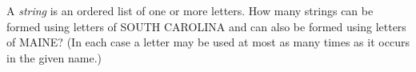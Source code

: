 A \emph{string} is an ordered list of one or more letters. How many strings can be formed using letters of SOUTH CAROLINA and can also be formed using letters of MAINE? (In each case a letter may be used at most as many times as it occurs in the given name.)
